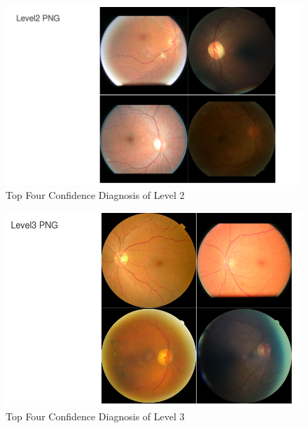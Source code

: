 \documentclass[letterpaper,12pt]{article}
\begin{document}
\begin{figure}[htbp]
\begin{center}
\includegraphics[scale=0.5]{images/Level2_Top4.png}
\caption{Top Four Confidence Diagnosis of Level 2}
\label{DR2}
\end{center}
\end{figure}

\begin{figure}[htbp]
\begin{center}
\includegraphics[scale=0.5]{images/Level3_Top4.png}
\caption{Top Four Confidence Diagnosis of Level 3}
\label{DR3}
\end{center}
\end{figure}
\end{document}
